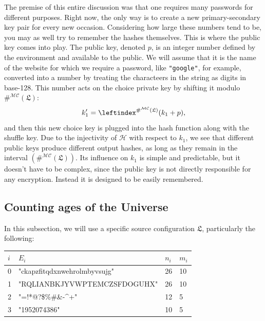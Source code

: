 \documentclass[12pt, a4paper]{article}
\renewcommand{\C}{\mathcal{C}}
\renewcommand{\H}{\mathcal{H}}
\newcommand{\M}{\mathcal{M}}
\newcommand{\conf}{\mathfrak{L}}
\newcommand{\lui}[1]{\leftindex^{#1}}
\begin{document}
The premise of this entire discussion was that one requires many passwords for different purposes. Right now, the only way is to create a new primary-secondary key pair for every new occasion. Considering how large these numbers tend to be, you may as well try to remember the hashes themselves. This is where the public key comes into play. The public key, denoted $ p $, is an integer number defined by the environment and available to the public. We will assume that it is the name of the website for which we require a password, like \texttt{"google"}, for example, converted into a number by treating the characteers in the string as digits in base-128. This number acts on the choice private key by shifting it modulo $ \#^{\M\C}(\conf) $:
\[ k_1' = \lui{\#^{\M\C}(\conf)}(k_1 + p), \] 
and then this new choice key is plugged into the hash function along with the shuffle key. Due to the injectivity of $ \H $ with respect to $ k_1 $, we see that different public keys produce different output hashes, as long as they remain in the interval $ \left( \#^{\M\C}(\conf) \right) $. Its influence on $ k_1 $ is simple and predictable, but it doesn't have to be complex, since the public key is not directly responsible for any encryption. Instead it is designed to be easily remembered.

\subsection{Counting ages of the Universe}

In this subsection, we will use a specific source configuration $ \conf $, particularly the following:

\begin{center}
\def\arraystretch{1.2}
\begin{tabular}{l|l|l|l}\ttfamily
    $ i $ & $ E_i $ & $ n_i $ & $ m_i $\\
    \hline
    0 & \ttfamily"ckapzfitqdxnwehrolmbyvsujg" & 26 & 10\\
    1 & \ttfamily"RQLIANBKJYVWPTEMCZSFDOGUHX" & 26 & 10\\
    2 & \ttfamily"=!*@?\$\%\#\&-\^{}+"        & 12 & 5\\
    3 & \ttfamily"1952074386"                 & 10 & 5\\
\end{tabular}
\end{center}
\end{document}
